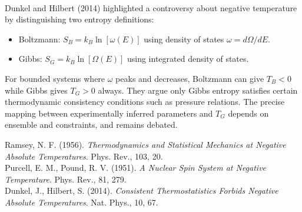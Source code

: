 \begin{technical}
\\[0.5em]
Dunkel and Hilbert (2014) highlighted a controversy about negative temperature by distinguishing two entropy definitions:
\begin{itemize}[leftmargin=1em,itemsep=0pt,topsep=2pt]
\item Boltzmann: $S_B = k_B \ln[\omega(E)]$ using density of states $\omega = d\Omega/dE$.
\item Gibbs: $S_G = k_B \ln[\Omega(E)]$ using integrated density of states.
\end{itemize}
For bounded systems where $\omega$ peaks and decreases, Boltzmann can give $T_B < 0$ while Gibbs gives $T_G > 0$ always. They argue only Gibbs entropy satisfies certain thermodynamic consistency conditions such as pressure relations. The precise mapping between experimentally inferred parameters and $T_G$ depends on ensemble and constraints, and remains debated.

\techref
{\footnotesize
Ramsey, N. F. (1956). \textit{Thermodynamics and Statistical Mechanics at Negative Absolute Temperatures}. Phys. Rev., 103, 20. \\
Purcell, E. M., Pound, R. V. (1951). \textit{A Nuclear Spin System at Negative Temperature}. Phys. Rev., 81, 279. \\
Dunkel, J., Hilbert, S. (2014). \textit{Consistent Thermostatistics Forbids Negative Absolute Temperatures}. Nat. Phys., 10, 67.
}
\end{technical}
